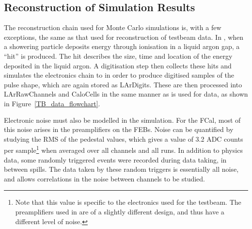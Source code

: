 %





\subsection{Reconstruction of Simulation Results}
The reconstruction chain used for Monte Carlo simulations is, with a few exceptions, the same as that used for reconstruction of testbeam data. In \geant, when a showering particle deposits energy through ionisation in a liquid argon gap, a ``hit'' is produced. The hit describes the size, time and location of the energy deposited in the liquid argon. A digitisation step then collects these hits and simulates the electronics chain to in order to produce digitised samples of the pulse shape, which are again stored as LArDigits. These are then processed into LArRawChannels and CaloCells in the same manner as is used for data, as shown in Figure~\ref{TB_data_flowchart}.


Electronic noise must also be modelled in the simulation. For the FCal, most of this noise arises in the preamplifiers on the FEBs. Noise can be quantified by studying the RMS of the pedestal values, which gives a value of 3.2 ADC counts per sample\footnote{Note that this value is specific to the electronics used for the testbeam. The preamplifiers used in \atlas are of a slightly different design, and thus have a different level of noise.} when averaged over all channels and all runs. In addition to physics data, some randomly triggered events were recorded during data taking, in between spills. The data taken by these random triggers is essentially all noise, and allows correlations in the noise between channels to be studied.

